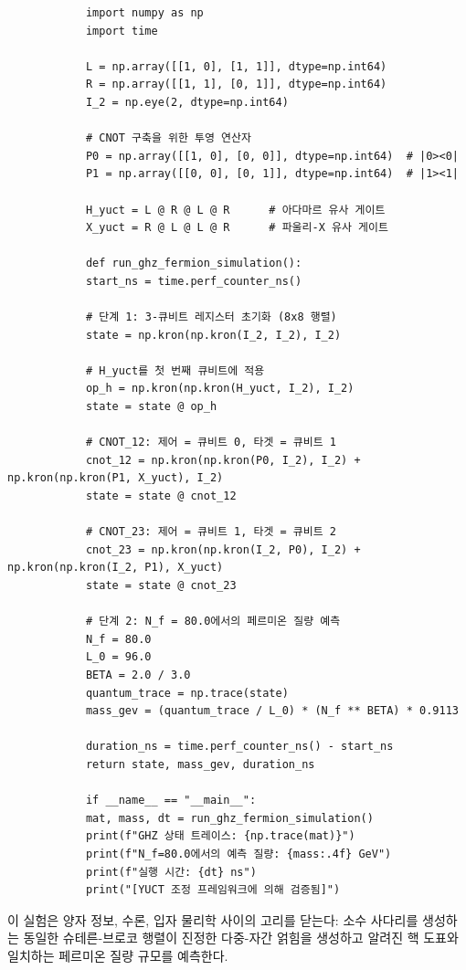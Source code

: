 \documentclass[11pt,a4paper]{article}
\begin{document}
	\begin{tcolorbox}[title=YUCT GHZ 및 페르미온 질량 에뮬레이터 (Python), breakable]
		\begin{lstlisting}
			import numpy as np
			import time
			
			L = np.array([[1, 0], [1, 1]], dtype=np.int64)
			R = np.array([[1, 1], [0, 1]], dtype=np.int64)
			I_2 = np.eye(2, dtype=np.int64)
			
			# CNOT 구축을 위한 투영 연산자
			P0 = np.array([[1, 0], [0, 0]], dtype=np.int64)  # |0><0|
			P1 = np.array([[0, 0], [0, 1]], dtype=np.int64)  # |1><1|
			
			H_yuct = L @ R @ L @ R      # 아다마르 유사 게이트
			X_yuct = R @ L @ L @ R      # 파울리-X 유사 게이트
			
			def run_ghz_fermion_simulation():
			start_ns = time.perf_counter_ns()
			
			# 단계 1: 3-큐비트 레지스터 초기화 (8x8 행렬)
			state = np.kron(np.kron(I_2, I_2), I_2)
			
			# H_yuct를 첫 번째 큐비트에 적용
			op_h = np.kron(np.kron(H_yuct, I_2), I_2)
			state = state @ op_h
			
			# CNOT_12: 제어 = 큐비트 0, 타겟 = 큐비트 1
			cnot_12 = np.kron(np.kron(P0, I_2), I_2) + np.kron(np.kron(P1, X_yuct), I_2)
			state = state @ cnot_12
			
			# CNOT_23: 제어 = 큐비트 1, 타겟 = 큐비트 2
			cnot_23 = np.kron(np.kron(I_2, P0), I_2) + np.kron(np.kron(I_2, P1), X_yuct)
			state = state @ cnot_23
			
			# 단계 2: N_f = 80.0에서의 페르미온 질량 예측
			N_f = 80.0
			L_0 = 96.0
			BETA = 2.0 / 3.0
			quantum_trace = np.trace(state)
			mass_gev = (quantum_trace / L_0) * (N_f ** BETA) * 0.9113
			
			duration_ns = time.perf_counter_ns() - start_ns
			return state, mass_gev, duration_ns
			
			if __name__ == "__main__":
			mat, mass, dt = run_ghz_fermion_simulation()
			print(f"GHZ 상태 트레이스: {np.trace(mat)}")
			print(f"N_f=80.0에서의 예측 질량: {mass:.4f} GeV")
			print(f"실행 시간: {dt} ns")
			print("[YUCT 조정 프레임워크에 의해 검증됨]")
		\end{lstlisting}
	\end{tcolorbox}
	
	이 실험은 양자 정보, 수론, 입자 물리학 사이의 고리를 닫는다: 소수 사다리를 생성하는 동일한 슈테른-브로코 행렬이 진정한 다중-자간 얽힘을 생성하고 알려진 핵 도표와 일치하는 페르미온 질량 규모를 예측한다.
	
\end{document}
